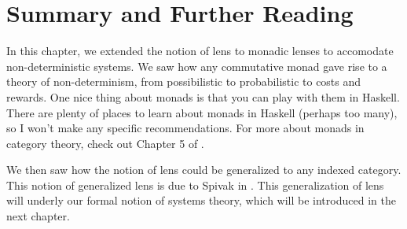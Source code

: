 \documentclass[DynamicalBook]{subfiles}
\begin{document}
\section{Summary and Further Reading}

In this chapter, we extended the notion of lens to monadic lenses to accomodate
non-deterministic systems. We saw how any commutative monad gave rise to a
theory of non-determinism, from possibilistic to probabilistic to costs and
rewards. One nice thing about monads is that you can play with them in Haskell.
There are plenty of places to learn about monads in Haskell (perhaps too many),
so I won't make any specific recommendations. For more about monads in category
theory, check out Chapter 5 of \cite{perrone2021notes}.

We then saw how the notion of lens could be generalized to any indexed category.
This notion of generalized lens is due to Spivak in
\cite{spivak2019generalized}. This generalization of lens will underly our
formal notion of systems theory, which will be introduced in the
next chapter. 
\end{document}
